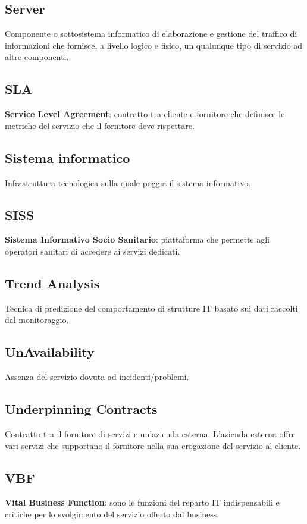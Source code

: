 \subsection*{Server}
Componente o sottosistema informatico di elaborazione e gestione del traffico di informazioni che fornisce, a livello logico e fisico, un qualunque tipo di servizio ad altre componenti.

\subsection*{SLA}

\textbf{Service Level Agreement}: contratto tra cliente e fornitore che definisce le metriche del servizio che il fornitore deve rispettare.

\subsection*{Sistema informatico}
Infrastruttura tecnologica sulla quale poggia il sistema informativo.


\subsection*{SISS}

\textbf{Sistema Informativo Socio Sanitario}: piattaforma che permette agli operatori sanitari di accedere ai servizi dedicati.




\subsection*{Trend Analysis}

Tecnica di predizione del comportamento di strutture IT basato sui dati raccolti dal monitoraggio.


\subsection*{UnAvailability}
Assenza del servizio dovuta ad incidenti/problemi.

\subsection*{Underpinning Contracts}
Contratto tra il fornitore di servizi e un'azienda esterna. L'azienda esterna offre vari servizi che supportano il fornitore nella sua erogazione del servizio al cliente. 


\subsection*{VBF}

\textbf{Vital Business Function}: sono le funzioni del reparto IT indispensabili e critiche per lo svolgimento del servizio offerto dal business.

